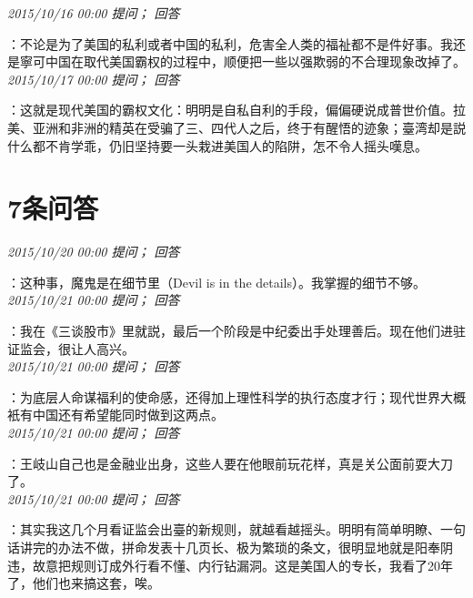 \documentclass[twocolumn]{ctexart}
\begin{document}
\textit{\hfill\noindent\small 2015/10/16 00:00 提问； 回答}

：不论是为了美国的私利或者中国的私利，危害全人类的福祉都不是件好事。我还是寧可中国在取代美国霸权的过程中，顺便把一些以强欺弱的不合理现象改掉了。\\

\textit{\hfill\noindent\small 2015/10/17 00:00 提问； 回答}

：这就是现代美国的霸权文化：明明是自私自利的手段，偏偏硬说成普世价值。拉美、亚洲和非洲的精英在受骗了三、四代人之后，终于有醒悟的迹象；臺湾却是説什么都不肯学乖，仍旧坚持要一头栽进美国人的陷阱，怎不令人摇头嘆息。\\

\section{7条问答}

\textit{\hfill\noindent\small 2015/10/20 00:00 提问； 回答}

：这种事，魔鬼是在细节里（Devil is in the details）。我掌握的细节不够。\\

\textit{\hfill\noindent\small 2015/10/21 00:00 提问； 回答}

：我在《三谈股市》里就説，最后一个阶段是中纪委出手处理善后。现在他们进驻证监会，很让人高兴。\\

\textit{\hfill\noindent\small 2015/10/21 00:00 提问； 回答}

：为底层人命谋福利的使命感，还得加上理性科学的执行态度才行；现代世界大概衹有中国还有希望能同时做到这两点。\\

\textit{\hfill\noindent\small 2015/10/21 00:00 提问； 回答}

：王岐山自己也是金融业出身，这些人要在他眼前玩花样，真是关公面前耍大刀了。\\

\textit{\hfill\noindent\small 2015/10/21 00:00 提问； 回答}

：其实我这几个月看证监会出臺的新规则，就越看越摇头。明明有简单明瞭、一句话讲完的办法不做，拼命发表十几页长、极为繁琐的条文，很明显地就是阳奉阴违，故意把规则订成外行看不懂、内行钻漏洞。这是美国人的专长，我看了20年了，他们也来搞这套，唉。\\
\end{document}

